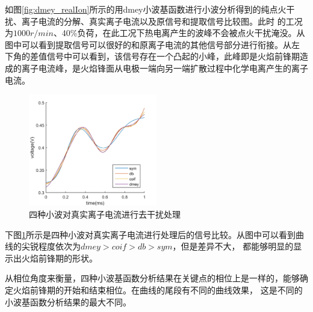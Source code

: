 \par 如图\ref{fig:dmey_realIon}所示的用dmey小波基函数进行小波分析得到的纯点火干扰、离子电流的分解、真实离子电流以及原信号和提取信号比较图。此时
的工况为$1000r/min$、40\%负荷，在此工况下热电离产生的波峰不会被点火干扰淹没。从图中可以看到提取信号可以很好的和原离子电流的其他信号部分进行衔接。从左
下角的差值信号中可以看到，该信号存在一个凸起的小峰，此峰即是火焰前锋期造成的离子电流峰，是火焰锋面从电极一端向另一端扩散过程中化学电离产生的离子电流。
\begin{figure}[!ht]
	\centering
	\includegraphics[width=0.5\textwidth]{thesis_figure/ion_chapter/diff_wv_comp}
	\caption{\label{fig:diff_wv_comp}四种小波对真实离子电流进行去干扰处理}
\end{figure}
\par 下图\ref{fig:diff_wv_comp}所示是四种小波对真实离子电流进行处理后的信号比较。从图中可以看到曲线的尖锐程度依次为$dmey>coif>db>sym$，但是差异不大，
都能够明显的显示出火焰前锋期的形状。\par 从相位角度来衡量，四种小波基函数分析结果在关键点的相位上是一样的，能够确定火焰前锋期的开始和结束相位。在曲线的尾段有不同的曲线效果，
这是不同的小波基函数分析结果的最大不同。
